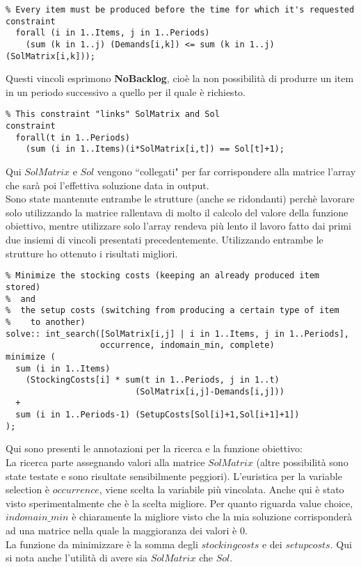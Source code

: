 \documentclass[12pt]{article}
\begin{document}
\begin{verbatim}
% Every item must be produced before the time for which it's requested
constraint
  forall (i in 1..Items, j in 1..Periods)
    (sum (k in 1..j) (Demands[i,k]) <= sum (k in 1..j) (SolMatrix[i,k]));
\end{verbatim}
Questi vincoli esprimono \textbf{NoBacklog}, cioè la non possibilità di produrre un item in un periodo successivo a quello per il quale è richiesto.

\begin{verbatim}
% This constraint "links" SolMatrix and Sol
constraint
  forall(t in 1..Periods)
    (sum (i in 1..Items)(i*SolMatrix[i,t]) == Sol[t]+1);
\end{verbatim}
Qui $SolMatrix$ e $Sol$ vengono ``collegati" per far corrispondere alla matrice l'array che sarà poi l'effettiva soluzione data in output.\\
Sono state mantenute entrambe le strutture (anche se ridondanti) perchè lavorare solo utilizzando la matrice rallentava di molto il calcolo del valore della funzione obiettivo, mentre utilizzare solo l'array rendeva più lento il lavoro fatto dai primi due insiemi di vincoli presentati precedentemente. Utilizzando entrambe le strutture ho ottenuto i risultati migliori.

\begin{verbatim}
% Minimize the stocking costs (keeping an already produced item stored)
%  and
%  the setup costs (switching from producing a certain type of item
%    to another)
solve:: int_search([SolMatrix[i,j] | i in 1..Items, j in 1..Periods],
                   occurrence, indomain_min, complete)
minimize (
  sum (i in 1..Items)
    (StockingCosts[i] * sum(t in 1..Periods, j in 1..t)
                          (SolMatrix[i,j]-Demands[i,j]))
  +
  sum (i in 1..Periods-1) (SetupCosts[Sol[i]+1,Sol[i+1]+1])
);
\end{verbatim}
Qui sono presenti le annotazioni per la ricerca e la funzione obiettivo:\\
La ricerca parte assegnando valori alla matrice $SolMatrix$ (altre possibilità sono state testate e sono risultate sensibilmente peggiori). L'euristica per la variable selection è $occurrence$, viene scelta la variabile più vincolata. Anche qui è stato visto sperimentalmente che è la scelta migliore. Per quanto riguarda value choice, $indomain\_min$ è chiaramente la migliore visto che la mia soluzione corrisponderà ad una matrice nella quale la maggioranza dei valori è 0.\\
La funzione da minimizzare è la somma degli $stocking costs$ e dei $setup costs$. Qui si nota anche l'utilità di avere sia $SolMatrix$ che $Sol$.
\end{document}
